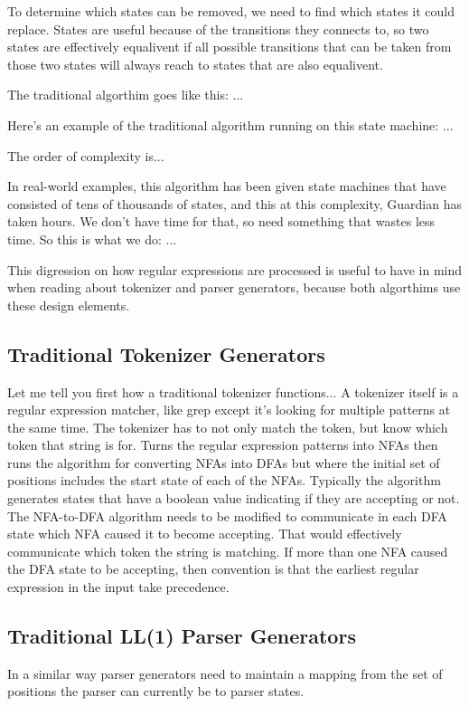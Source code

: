 {{		To determine which states can be removed, we need to find which states
		it could replace. States are useful because of the transitions they
		connects to, so two states are effectively equalivent if all possible
		transitions that can be taken from those two states will always
		reach to states that are also equalivent.
		
		The traditional algorthim goes like this:
			...
		
		Here's an example of the traditional algorithm running on this state
		machine:
			...
		
		The order of complexity is...
		
		In real-world examples, this algorithm has been given state machines
		that have consisted of tens of thousands
		of states, and this at this complexity, Guardian has taken hours.
		We don't have time for that, so need something that wastes less time.
		So this is what we do: ...
		
		This digression on how regular expressions are processed is useful
		to have in mind when reading about tokenizer and parser generators,
		because both algorthims use these design elements.
	}
	
	\subsection{Traditional Tokenizer Generators}
	{
		Let me tell you first how a traditional tokenizer functions...
		A tokenizer itself is a regular expression matcher, like grep
		except it's looking for multiple patterns at the same time.
		The tokenizer has to not only match the token, but know which
		token that string is for.
		Turns the regular expression patterns into NFAs
		then runs the algorithm for converting NFAs into DFAs
		but where the initial set of positions includes the start state of
		each of the NFAs. Typically the algorithm generates states that
		have a boolean value indicating if they are accepting or not.
		The NFA-to-DFA algorithm needs to be modified to communicate
		in each DFA state which NFA caused it to become accepting.
		That would effectively communicate which token the string is matching.
		If more than one NFA caused the DFA state to be accepting, then
		convention is that the earliest regular expression in the input
		take precedence.

	}
	
	\subsection{Traditional LL(1) Parser Generators}
	{
		In a similar way parser generators need to maintain a mapping from
		the set of positions the parser can currently be to parser states.
		
}}
